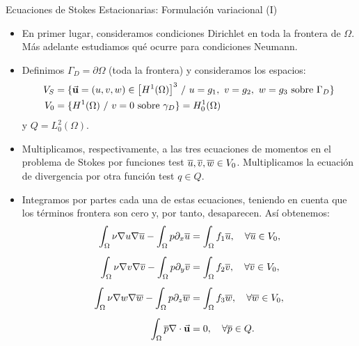 \documentclass[9pt, dvipsnames,]{beamer}
\newcommand{\Vtest}{\ensuremath{V_0}}
\begin{document}
\begin{frame}{Ecuaciones de Stokes Estacionarias: Formulación variacional (I)}
  \small
  \begin{itemize}
  \item En primer lugar, consideramos condiciones Dirichlet en toda la frontera de $\Omega$. Más adelante estudiamos qué ocurre para condiciones Neumann.
  \item Definimos $\Gamma_D = \partial\Omega$ (toda la frontera) y consideramos los espacios:
    \begin{align*}
      V_S &= \{ \uu=(u,v,w)\in \big[H^1(\Omega)\big]^3 \ / \ u=g_ 1,\ v=g_ 2,\ w=g_3
            \text{ sobre } {\Gamma_D} \}
      \\
      \Vtest &= \{ H^1(\Omega) \ /\ v=0 \text{ sobre }\gamma_D \} = H^1_0(\Omega)
    \end{align*}
    y
    $Q=L_0^2(\Omega)$.
  \item Multiplicamos, respectivamente, a las tres
    ecuaciones de momentos en el problema de Stokes por funciones test
    $\bu, \bv, \bw \in \Vtest$. Multiplicamos la ecuación de divergencia
    por otra función test $q\in Q$.
  \item Integramos por partes cada una de estas ecuaciones, teniendo
    en cuenta que los términos frontera son cero y, por tanto,
    desaparecen. Así obtenemos:
    \begin{align*}
      \int_\Omega \nu\grad u\grad\bu - \int_\Omega p\dx \bu &= \int_\Omega f_1 \bu, \quad \forall \bu\in \Vtest,
      \\[0.5em]
      \int_\Omega \nu\grad v\grad\bv - \int_\Omega p\dy \bv &= \int_\Omega f_2 \bv, \quad \forall \bv\in \Vtest,
      \\[0.5em]
      \int_\Omega \nu\grad w\grad\bw - \int_\Omega p\dz \bw &= \int_\Omega f_3 \bw, \quad \forall \bw\in \Vtest,
      \\[0.5em]
      \int_\Omega \bp \div{\uu} & =  0, \quad \forall \bp \in Q.
    \end{align*}

  \end{itemize}
\end{frame}
\end{document}
